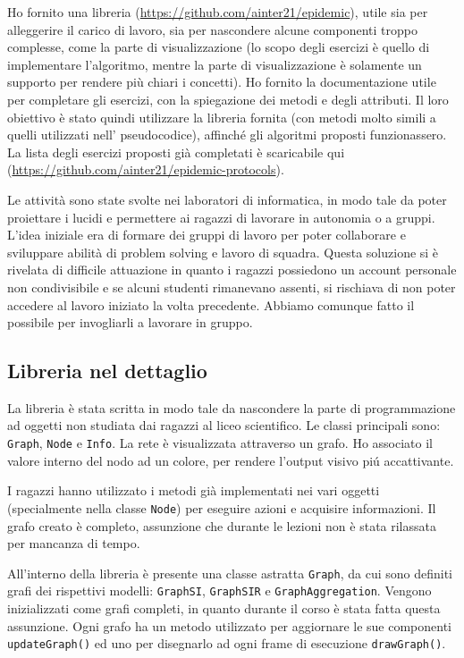 Ho fornito una libreria (\href{https://github.com/ainter21/epidemic}{https://github.com/ainter21/epidemic}), utile sia per alleggerire il carico di lavoro, sia per nascondere alcune componenti troppo complesse, come la parte di visualizzazione (lo scopo degli esercizi è quello di implementare l’algoritmo, mentre la parte di visualizzazione è solamente un supporto per rendere più chiari i concetti).
Ho fornito la documentazione utile per completare gli esercizi, con la spiegazione dei metodi e degli attributi. Il loro obiettivo è stato quindi utilizzare la libreria fornita (con metodi molto simili a quelli utilizzati nell' pseudocodice), affinché gli algoritmi proposti funzionassero. La lista degli esercizi proposti già completati è scaricabile qui (\href{https://github.com/ainter21/epidemic-protocols}{https://github.com/ainter21/epidemic-protocols}).

Le attività sono state svolte nei laboratori di informatica, in modo tale da poter proiettare i lucidi e permettere ai ragazzi di lavorare in autonomia o a gruppi. L'idea iniziale era di formare dei gruppi di lavoro per poter collaborare e sviluppare abilità di problem solving e lavoro di squadra. Questa soluzione si è rivelata di difficile attuazione in quanto i ragazzi possiedono un account personale non condivisibile e se alcuni studenti rimanevano assenti, si rischiava di non poter accedere al lavoro iniziato la volta precedente. Abbiamo comunque fatto il possibile per invogliarli a lavorare in gruppo.

\subsection{Libreria nel dettaglio}
La libreria è stata scritta in modo tale da nascondere la parte di programmazione ad oggetti non studiata dai ragazzi al liceo scientifico. Le classi principali sono: \texttt{Graph}, \texttt{Node} e \texttt{Info}. La rete è visualizzata attraverso un grafo. Ho associato il valore interno del nodo ad un colore, per rendere l'output visivo piú accattivante.

I ragazzi hanno utilizzato i metodi già implementati nei vari oggetti (specialmente nella classe \texttt{Node}) per eseguire azioni e acquisire informazioni. Il grafo creato è completo, assunzione che durante le lezioni non è stata rilassata per mancanza di tempo.

All'interno della libreria è presente una classe astratta \texttt{Graph}, da cui sono definiti grafi dei rispettivi modelli: \texttt{GraphSI}, \texttt{GraphSIR} e \texttt{GraphAggregation}. Vengono inizializzati come grafi completi, in quanto durante il corso è stata fatta questa assunzione. Ogni grafo ha un metodo utilizzato per aggiornare le sue componenti \texttt{updateGraph()} ed uno per disegnarlo ad ogni frame di esecuzione \texttt{drawGraph()}. 


